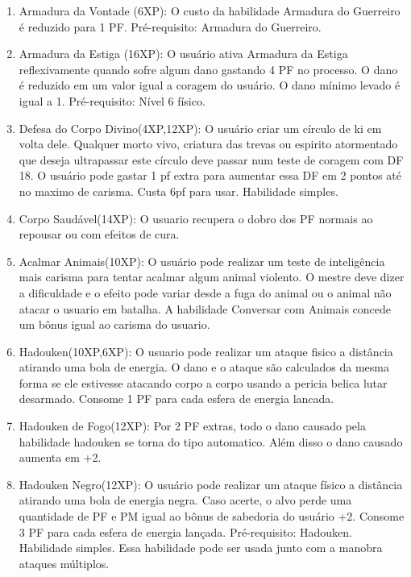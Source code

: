\begin{enumerate}
	\item Armadura da Vontade (6XP): O custo da habilidade Armadura do Guerreiro é reduzido para 1 PF. Pré-requisito: Armadura do Guerreiro. 

	\item Armadura da Estiga (16XP): O usuário ativa Armadura da Estiga reflexivamente quando sofre algum dano gastando 4 PF no processo. O dano é reduzido em um valor igual a coragem do usuário. O dano mínimo levado é igual a 1. Pré-requisito: Nível 6 físico. 

	\item Defesa do Corpo Divino(4XP,12XP): O usuário criar um círculo de ki em volta dele. Qualquer morto vivo, criatura das trevas ou espirito atormentado que deseja ultrapassar este círculo deve passar num teste de coragem com DF 18. O usuário pode gastar 1 pf extra para aumentar essa DF em 2 pontos até no maximo de carisma. Custa 6pf para usar. Habilidade simples.

\item Corpo Saudável(14XP): O usuario recupera o dobro dos PF normais ao repousar ou com efeitos de cura.
	
	\item Acalmar Animais(10XP): O usuário pode realizar um teste de inteligência mais carisma para tentar acalmar algum animal violento. O mestre deve dizer a dificuldade e o efeito pode variar desde a fuga do animal ou o animal não atacar o usuario em batalha. A habilidade Conversar com Animais concede um bônus igual ao carisma do usuario.

  	\item Hadouken(10XP,6XP): O usuario pode realizar um ataque fisico a distância atirando uma bola de energia. O dano e o ataque são calculados da mesma forma se ele estivesse atacando corpo a corpo usando a pericia belica lutar desarmado. Consome 1 PF para cada esfera de energia lancada. 
  
\item Hadouken de Fogo(12XP): Por 2 PF extras, todo o dano causado pela habilidade hadouken se torna do tipo automatico. Além disso o dano causado aumenta em +2. 

	\item Hadouken Negro(12XP): O usuário pode realizar um ataque físico a distância atirando uma bola de energia negra. Caso acerte, o alvo perde uma quantidade de PF e PM igual ao bônus de sabedoria do usuário +2. Consome 3 PF para cada esfera de energia lançada. Pré-requisito: Hadouken. Habilidade simples. Essa habilidade pode ser usada junto com a manobra ataques múltiplos.
		

\end{enumerate}
